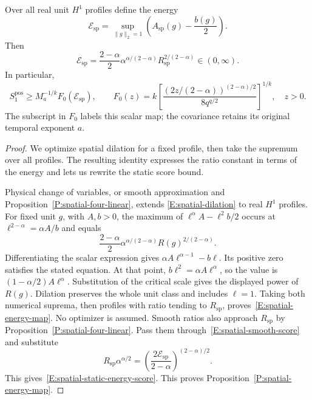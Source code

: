 \begin{proposition}
  \label{P:spatial-energy-map}
  Over all real unit $H^1$ profiles define the energy
  \[
    \mathcal{E}_{\mathrm{sp}}
    =\sup_{\|g\|_2=1}
    \left(A_{\mathrm{sp}}(g)-\frac{b(g)}2\right).
  \]
  Then
  \begin{equation}\label{E:spatial-energy-map}
    \mathcal{E}_{\mathrm{sp}}
    =\frac{2-\alpha}{2}\alpha^{\alpha/(2-\alpha)}
    R_{\mathrm{sp}}^{2/(2-\alpha)}
    \in(0,\infty).
  \end{equation}
  In particular,
  \begin{equation}\label{E:spatial-static-energy-score}
    S_1^{\mathrm{pos}}\ge M_a^{-1/k}F_0(\mathcal{E}_{\mathrm{sp}}),
    \qquad
    F_0(z)=k\left[
    \frac{(2z/(2-\alpha))^{(2-\alpha)/2}}{8q^{q/2}}
    \right]^{1/k},\quad z>0.
  \end{equation}
  The subscript in $F_0$ labels this scalar map; the covariance retains its
  original temporal exponent $a$.
\end{proposition}

\begin{proof}
  We optimize spatial dilation for a fixed profile, then take the supremum
  over all profiles. The resulting identity expresses the ratio constant in
  terms of the energy and lets us rewrite the static score bound.

  Physical change of variables, or smooth approximation and
  Proposition~\ref{P:spatial-four-linear}, extends \eqref{E:spatial-dilation} to
  real $H^1$ profiles. For fixed unit $g$, with $A,b > 0$, the maximum of
  $\ell^\alpha A-\ell^2b/2$ occurs at $\ell^{2-\alpha} = \alpha A/b$ and equals
  \[
    \frac{2-\alpha}{2}\alpha^{\alpha/(2-\alpha)}
    R(g)^{2/(2-\alpha)}.
  \]
  Differentiating the scalar expression gives $\alpha A\ell^{\alpha-1}-b\ell$.
  Its positive zero satisfies the stated equation. At that point,
  $b\ell^2=\alpha A\ell^\alpha$, so the value is $(1-\alpha/2)A\ell^\alpha$.
  Substitution of the critical scale gives the displayed power of $R(g)$.
  Dilation preserves the whole unit class and includes $\ell = 1$. Taking both
  numerical suprema, then profiles with ratio tending to $R_{\mathrm{sp}}$,
  proves~\eqref{E:spatial-energy-map}. No optimizer is assumed. Smooth ratios
  also approach $R_{\mathrm{sp}}$ by Proposition~\ref{P:spatial-four-linear}.
  Pass them through~\eqref{E:spatial-smooth-score} and substitute
  \[
    R_{\mathrm{sp}}\alpha^{\alpha/2}
    =\left(\frac{2\mathcal{E}_{\mathrm{sp}}}{2-\alpha}
    \right)^{(2-\alpha)/2}.
  \]
  This gives~\eqref{E:spatial-static-energy-score}. This proves
  Proposition~\ref{P:spatial-energy-map}.
\end{proof}

